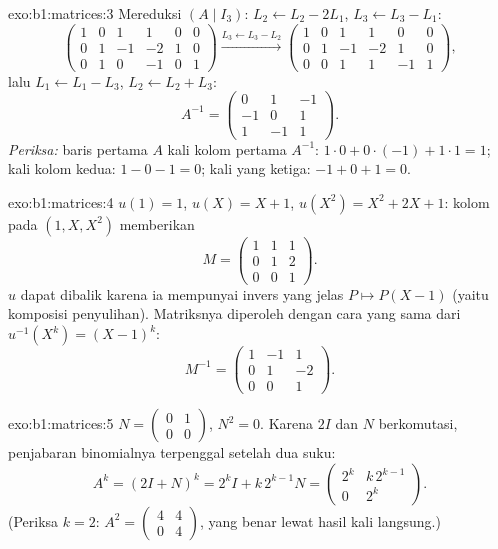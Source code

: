 \begin{solution}{exo:b1:matrices:3}
Mereduksi $(A \mid I_3)$: $L_2 \leftarrow L_2 - 2L_1$, $L_3
\leftarrow L_3 - L_1$:
\[
\begin{pmatrix}
1 & 0 & 1 & 1 & 0 & 0\\
0 & 1 & -1 & -2 & 1 & 0\\
0 & 1 & 0 & -1 & 0 & 1
\end{pmatrix}
\xrightarrow{L_3 \leftarrow L_3 - L_2}
\begin{pmatrix}
1 & 0 & 1 & 1 & 0 & 0\\
0 & 1 & -1 & -2 & 1 & 0\\
0 & 0 & 1 & 1 & -1 & 1
\end{pmatrix},
\]
lalu $L_1 \leftarrow L_1 - L_3$, $L_2 \leftarrow L_2 + L_3$:
\[
A^{-1} = \begin{pmatrix}
0 & 1 & -1\\
-1 & 0 & 1\\
1 & -1 & 1
\end{pmatrix}.
\]
\emph{Periksa:} baris pertama $A$ kali kolom pertama $A^{-1}$: $1
\cdot 0 + 0\cdot(-1) + 1\cdot 1 = 1$; kali kolom kedua: $1 - 0 -
1 = 0$; kali yang ketiga: $-1 + 0 + 1 = 0$.
\end{solution}

\begin{solution}{exo:b1:matrices:4}
$u(1) = 1$, $u(X) = X + 1$, $u(X^2) = X^2 + 2X + 1$: kolom
 pada $(1, X, X^2)$ memberikan
\[
M = \begin{pmatrix}
1 & 1 & 1\\
0 & 1 & 2\\
0 & 0 & 1
\end{pmatrix}.
\]
$u$ dapat dibalik karena ia mempunyai invers yang jelas $P \mapsto P(X
- 1)$ (yaitu komposisi penyulihan). Matriksnya diperoleh dengan
cara yang sama dari $u^{-1}(X^k) = (X-1)^k$:
\[
M^{-1} = \begin{pmatrix}
1 & -1 & 1\\
0 & 1 & -2\\
0 & 0 & 1
\end{pmatrix}.
\]
\end{solution}

\begin{solution}{exo:b1:matrices:5}
$N = \begin{pmatrix} 0 & 1\\ 0 & 0\end{pmatrix}$, $N^2 = 0$. Karena
$2I$ dan $N$ berkomutasi, penjabaran binomialnya terpenggal setelah dua
suku:
\[
A^k = (2I + N)^k = 2^k I + k\,2^{k-1} N
= \begin{pmatrix} 2^k & k\,2^{k-1}\\ 0 & 2^k\end{pmatrix}.
\]
(Periksa $k = 2$: $A^2 = \begin{pmatrix}4 & 4\\ 0 & 4\end{pmatrix}$,
yang benar lewat hasil kali langsung.)
\end{solution}

